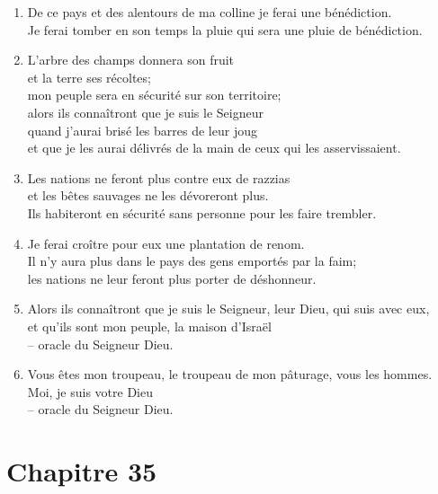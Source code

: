 \begin{enumerate}[leftmargin=\psleftmargin, labelsep = \pslabelsep, label={\arabic*}, font=\color{\pscolor}\small\textsuperscript, parsep=0em, itemsep=0em, topsep=0em ]
    \item De ce pays et des alentours de ma colline je ferai une bénédiction. \\ Je ferai tomber en son temps la pluie qui sera une pluie de bénédiction.
    \item L’arbre des champs donnera son fruit \\ et la terre ses récoltes; \\ mon peuple sera en sécurité sur son territoire; \\ alors ils connaîtront que je suis le Seigneur \\ 
    quand j’aurai brisé les barres de leur joug \\ et que je les aurai délivrés de la main de ceux qui les asservissaient.
    \item Les nations ne feront plus contre eux de razzias \\ et les bêtes sauvages ne les dévoreront plus. \\ Ils habiteront en sécurité sans personne pour les faire trembler.
    \item Je ferai croître pour eux une plantation de renom. \\ Il n’y aura plus dans le pays des gens emportés par la faim; \\ les nations ne leur feront plus porter de déshonneur.\verseSpace
    \item Alors ils connaîtront que je suis le Seigneur, leur Dieu, qui suis avec eux, \\ et qu’ils sont mon peuple, la maison d’Israël \\ – oracle du Seigneur Dieu.
    \item Vous êtes mon troupeau, le troupeau de mon pâturage, vous les hommes. \\ Moi, je suis votre Dieu \\ – oracle du Seigneur Dieu.
\end{enumerate}
\newpage


\section*{Chapitre 35}
